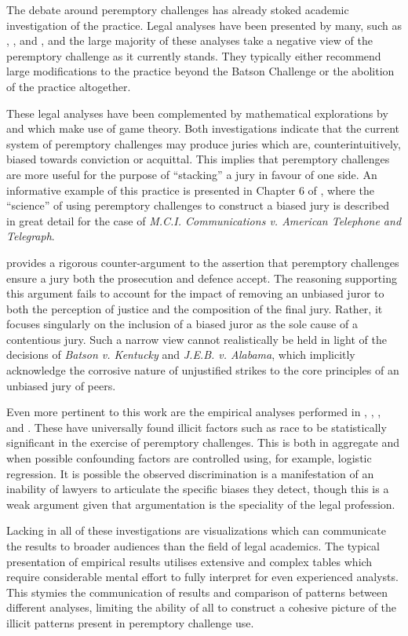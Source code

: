 The debate around peremptory challenges has already stoked academic investigation of the practice. Legal analyses have been
presented by many, such as \cite{hoffman1997}, \cite{broderick1992}, and \cite{Nunn1993}, and the large majority of these
analyses take a negative view of the peremptory challenge as it currently stands. They typically either recommend large
modifications to the practice beyond the Batson Challenge or the abolition of the practice altogether.

These legal analyses have been complemented by mathematical explorations by \cite{ford2010} and \cite{flanagan2015} which make use of game
theory. Both investigations indicate that the current system of peremptory challenges may produce juries which are, counterintuitively, biased
towards conviction or acquittal. This implies that peremptory challenges are more useful for the purpose of ``stacking'' a jury in favour of one side. An informative example of this practice is presented in  Chapter 6 of \cite{hansvidjudging}, where the ``science'' of using peremptory challenges to construct a biased jury is described in great detail for the case of \textit{M.C.I. Communications v. American Telephone and Telegraph}.

\cite{hoffman1997} provides a rigorous counter-argument to the assertion that peremptory challenges ensure a jury both the prosecution and defence accept. The reasoning supporting this argument fails to account for the
impact of removing an unbiased juror to both the perception of justice and the composition of the final jury. Rather, it focuses
singularly on the inclusion of a biased juror as the sole cause of a contentious jury. Such a narrow view cannot
realistically be held in light of the decisions of \textit{Batson v. Kentucky} and \textit{J.E.B. v. Alabama}, which implicitly
acknowledge the corrosive nature of unjustified strikes to the core principles of an unbiased jury of peers.

Even more pertinent to this work are the empirical analyses performed in \cite{PerempChalMurder}, \cite{JurySunshineProj},
\cite{StubbornLegacy}, and \cite{baldus2012}. These have
universally found illicit factors such as race to be statistically significant in
the exercise of peremptory challenges. This is both in aggregate and when possible confounding factors are controlled using, for example,
logistic regression. It is possible the observed discrimination is a manifestation of an inability of lawyers to
articulate the specific biases they detect, though this is a weak argument given that argumentation is the speciality of the legal profession.

Lacking in all of these investigations are visualizations which can communicate the results to broader audiences than the field of legal academics. The typical presentation of empirical results utilises extensive and complex tables which require considerable mental effort to fully interpret for even experienced analysts. This stymies the communication of results and comparison of patterns between different analyses, limiting the ability of all to construct a cohesive picture of the illicit patterns present in peremptory challenge use.